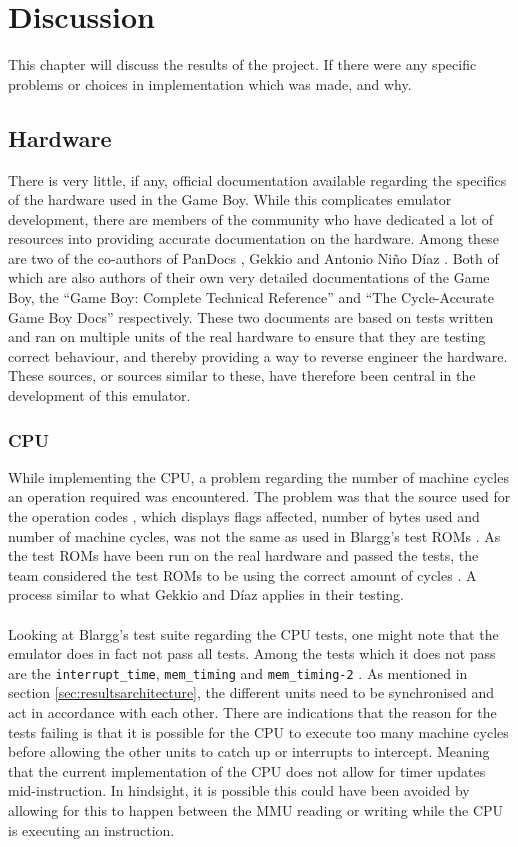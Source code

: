 \chapter{Discussion}
This chapter will discuss the results of the project. If there were any specific problems or choices in implementation which was made, and why.

\section{Hardware}
There is very little, if any, official documentation available regarding the specifics of the hardware used in the Game Boy. While this complicates emulator development, there are members of the community who have dedicated a lot of resources into providing accurate documentation on the hardware. Among these are two of the co-authors of PanDocs \cite{pandocs}, Gekkio \cite{Gekkio.fi} and Antonio Niño Díaz \cite{AntonioND}. Both of which are also authors of their own very detailed documentations of the Game Boy, the ``Game Boy: Complete Technical Reference'' \cite{CompleteTechnicalReference} and ``The Cycle-Accurate Game Boy Docs'' \cite{TCAGBD} respectively. These two documents are based on tests written and ran on multiple units of the real hardware to ensure that they are testing correct behaviour, and thereby providing a way to reverse engineer the hardware. These sources, or sources similar to these, have therefore been central in the development of this emulator.

\subsection{CPU}
\label{sec:CPUDiscussion}
While implementing the CPU, a problem regarding the number of machine cycles an operation required was encountered. The problem was that the source used for the operation codes \cite{OpCodes}, which displays flags affected, number of bytes used and number of machine cycles, was not the same as used in Blargg's test ROMs \cite{Blargg}. As the test ROMs have been run on the real hardware and passed the tests, the team considered the test ROMs to be using the correct amount of cycles \cite{TestROMsResult}. A process similar to what Gekkio and Díaz applies in their testing.
\\\\
Looking at Blargg's test suite regarding the CPU tests, one might note that the emulator does in fact not pass all tests. Among the tests which it does not pass are the \texttt{interrupt\_time}, \texttt{mem\_timing} and \texttt{mem\_timing-2} \cite{Blargg}. As mentioned in section \ref{sec:resultsarchitecture}, the different units need to be synchronised and act in accordance with each other. There are indications that the reason for the tests failing is that it is possible for the CPU to execute too many machine cycles before allowing the other units to catch up or interrupts to intercept. Meaning that the current implementation of the CPU does not allow for timer updates mid-instruction. In hindsight, it is possible this could have been avoided by allowing for this to happen between the MMU reading or writing while the CPU is executing an instruction.
\\

